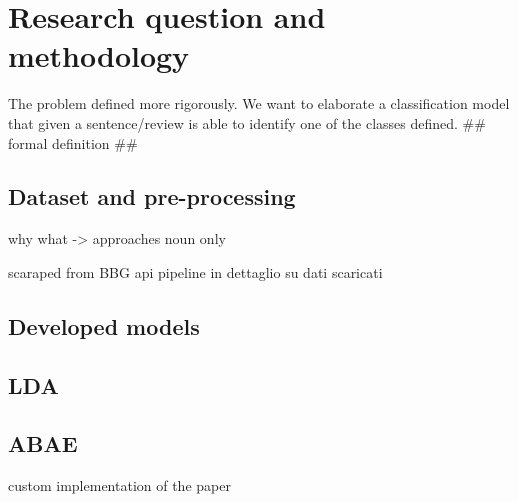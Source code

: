 \section{Research question and methodology}
The problem defined more rigorously.
We want to elaborate a classification model that given a sentence/review is able to identify one of the classes defined.
## formal definition ##

\subsection{Dataset and pre-processing}
why
what
-> approaches
noun only

scaraped from BBG api
pipeline in dettaglio su dati scaricati

\subsection{Developed models}

\subsection{LDA}

\subsection{ABAE}
custom implementation of the paper
